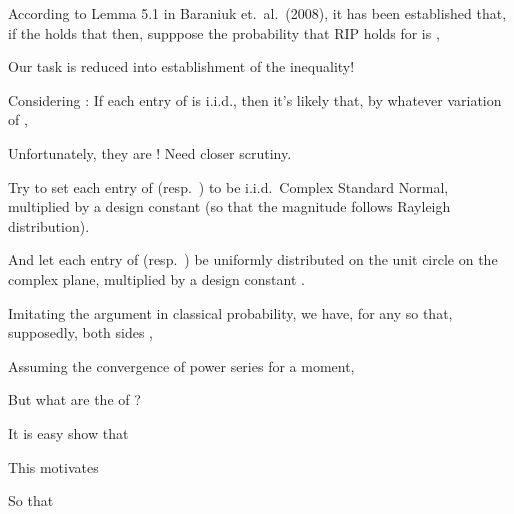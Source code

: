 {

\I According to Lemma 5.1 in Baraniuk et.\ al.\ (2008), it has been established that, if the  holds that
\I then, supppose the probability that RIP holds for  is ,

\I Our task is reduced into establishment of the inequality!
}
{
\I Considering : If each entry of  is i.i.d., then it's likely that, by whatever variation of ,

\I Unfortunately, they are !
\m {\Rightarrow} Need closer scrutiny.

\I Try to set each entry of  (resp.\ ) to be i.i.d.\ Complex Standard Normal, multiplied by a design constant  (so that the magnitude follows Rayleigh distribution).

\I And let each entry of  (resp.\ ) be uniformly distributed on the unit circle on the complex plane, multiplied by a design constant .
}
{
\I Imitating the  argument in classical probability, we have, for any  so that, supposedly, both sides \m {< \infty},

\I Assuming the convergence of power series for a moment,

\I But what are the  of \m {\rho}?
}
{
\I It is easy show that

\I This motivates

\I So that
}

